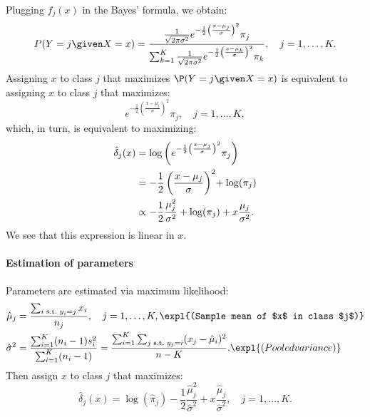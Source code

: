 Plugging $f_j(x)$ in the Bayes' formula, we obtain:
\begin{equation}
    P(Y = j \given X = x) = \frac{\frac{1}{\sqrt{2\pi\sigma^2}}e^{-\frac{1}{2}\left(\frac{x-\mu_j}{\sigma}\right)^2} \pi_j}{\sum_{k=1}^K \frac{1}{\sqrt{2\pi\sigma^2}}e^{-\frac{1}{2}\left(\frac{x-\mu_k}{\sigma}\right)^2} \pi_k},\quad j = 1, \ldots, K.
\end{equation}
Assigning $x$ to class $j$ that maximizes $\P(Y = j \given X = x)$ is equivalent to assigning $x$ to class $j$ that maximizes:
\begin{equation}
    e^{-\frac{1}{2}\left(\frac{x-\mu_j}{\sigma}\right)^2} \pi_j,\quad j = 1, \ldots, K,
\end{equation}
which, in turn, is equivalent to maximizing:
\begin{equation}
    \begin{aligned}
        \hat{\delta}_j(x) & = \log\left(e^{-\frac{1}{2}\left(\frac{x-\mu_j}{\sigma}\right)^2} \pi_j\right)         \\
                          & = -\frac{1}{2}\left(\frac{x-\mu_j}{\sigma}\right)^2\negmedspace + \log(\pi_j)          \\
                          & \propto -\frac{1}{2}\frac{\mu_j^2}{\sigma^2} + \log(\pi_j) + x \frac{\mu_j}{\sigma^2}.
    \end{aligned}
\end{equation}
We see that this expression is linear in $x$.

\paragraph{Estimation of parameters}

Parameters are estimated via maximum likelihood:
\begin{equation}
    \begin{aligned}
        \hat{\mu}_j    & = \frac{\sum_{i \text{ s.t.\@ } y_i = j} x_i}{n_j},\quad j = 1, \ldots, K, \expl{(Sample mean of $x$ in class $j$)}                                                           \\
        \hat{\sigma}^2 & = \frac{\sum_{i=1}^K (n_i - 1) s_i^2}{\sum_{i=1}^K (n_i - 1)} = \frac{\sum_{i = 1}^K \sum_{j\text{ s.t.\@ } y_j = i} (x_j - \hat{\mu}_i)^2}{n - K}. \expl{(Pooled variance)}
    \end{aligned}
\end{equation}
Then assign $x$ to class $j$ that maximizes:
\begin{equation}
    \hat{\delta}_j(x) = \log(\hat{\pi}_j) - \frac{1}{2}\frac{\hat{\mu}_j^2}{\hat{\sigma}^2} + x\frac{\hat{\mu}_j}{\hat{\sigma}^2},\quad j = 1, \ldots, K.
\end{equation}


